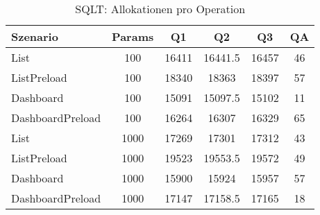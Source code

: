\begin{table}[ht]
\centering
\caption{SQLT: Allokationen pro Operation}
\begin{tabular}{lccccc}
\toprule
Szenario & Params & Q1 & Q2 & Q3 & QA \\
\midrule
	List & 100 & 16411 & 16441.5 & 16457 & 46 \\
	ListPreload & 100 & 18340 & 18363 & 18397 & 57 \\
	Dashboard & 100 & 15091 & 15097.5 & 15102 & 11 \\
	DashboardPreload & 100 & 16264 & 16307 & 16329 & 65 \\
	List & 1000 & 17269 & 17301 & 17312 & 43 \\
	ListPreload & 1000 & 19523 & 19553.5 & 19572 & 49 \\
	Dashboard & 1000 & 15900 & 15924 & 15957 & 57 \\
	DashboardPreload & 1000 & 17147 & 17158.5 & 17165 & 18 \\
\bottomrule
\end{tabular}
\label{tab:benchmark_sqlt_allocsperop}
\end{table}
	